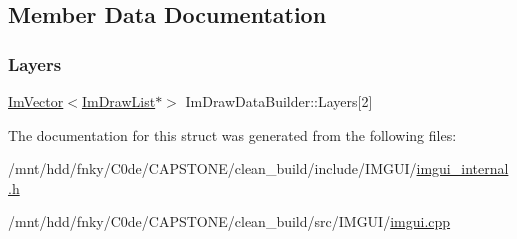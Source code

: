 \subsection{Member Data Documentation}
\mbox{\label{structImDrawDataBuilder_a2d03f8c80dac68fc0e2565dd79307dea}} 
\subsubsection{\texorpdfstring{Layers}{Layers}}
{\footnotesize\ttfamily \hyperlink{structImVector}{Im\+Vector}$<$\hyperlink{structImDrawList}{Im\+Draw\+List}$\ast$$>$ Im\+Draw\+Data\+Builder\+::\+Layers\mbox{[}2\mbox{]}}



The documentation for this struct was generated from the following files\+:\begin{DoxyCompactItemize}
\item 
/mnt/hdd/fnky/\+C0de/\+C\+A\+P\+S\+T\+O\+N\+E/clean\+\_\+build/include/\+I\+M\+G\+U\+I/\hyperlink{imgui__internal_8h}{imgui\+\_\+internal.\+h}\item 
/mnt/hdd/fnky/\+C0de/\+C\+A\+P\+S\+T\+O\+N\+E/clean\+\_\+build/src/\+I\+M\+G\+U\+I/\hyperlink{imgui_8cpp}{imgui.\+cpp}\end{DoxyCompactItemize}
